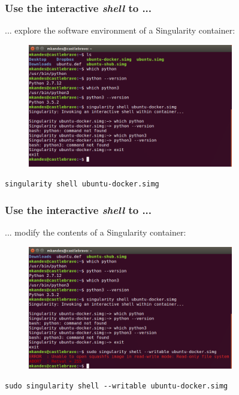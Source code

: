 \documentclass{beamer}
\begin{document}
\begin{frame}
   \frametitle{Use the interactive \textit{shell} to ... }
   ... explore the software environment of a Singularity container:
   \begin{figure}[htbp]
      \includegraphics[width=0.8\textwidth]{images/singularity-shell-docker-python.png}
   \end{figure}
   \lstinline{singularity shell ubuntu-docker.simg}
\end{frame}

\begin{frame}
   \frametitle{Use the interactive \textit{shell} to ... }
   ... modify the contents of a Singularity container:
   \begin{figure}[htbp]
      \includegraphics[width=0.8\textwidth]{images/singularity-shell-writable-fail.png}
   \end{figure}
   \lstinline{sudo singularity shell --writable ubuntu-docker.simg}
\end{frame}
\end{document}
